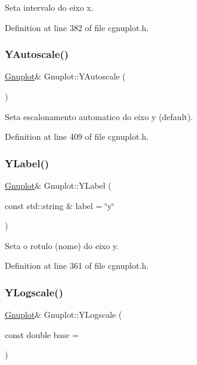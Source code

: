 Seta intervalo do eixo x. 



Definition at line 382 of file cgnuplot.\+h.

\mbox{\label{class_gnuplot_a288c0be86e20ff6986f5b43cb69b2bb0}} 
\subsubsection{\texorpdfstring{Y\+Autoscale()}{YAutoscale()}}
{\footnotesize\ttfamily \hyperlink{class_gnuplot}{Gnuplot}\& Gnuplot\+::\+Y\+Autoscale (\begin{DoxyParamCaption}{ }\end{DoxyParamCaption})\hspace{0.3cm}{\ttfamily [inline]}}



Seta escalonamento automatico do eixo y (default). 



Definition at line 409 of file cgnuplot.\+h.

\mbox{\label{class_gnuplot_ab4cdb8c1abd919b9851ca9a81667f2a4}} 
\subsubsection{\texorpdfstring{Y\+Label()}{YLabel()}}
{\footnotesize\ttfamily \hyperlink{class_gnuplot}{Gnuplot}\& Gnuplot\+::\+Y\+Label (\begin{DoxyParamCaption}\item[{const std\+::string \&}]{label = {\ttfamily \char`\"{}y\char`\"{}} }\end{DoxyParamCaption})\hspace{0.3cm}{\ttfamily [inline]}}



Seta o rotulo (nome) do eixo y. 



Definition at line 361 of file cgnuplot.\+h.

\mbox{\label{class_gnuplot_ab9b5e2985c658f7791d9a49dd7008bbf}} 
\subsubsection{\texorpdfstring{Y\+Logscale()}{YLogscale()}\hspace{0.1cm}{\footnotesize\ttfamily [1/2]}}
{\footnotesize\ttfamily \hyperlink{class_gnuplot}{Gnuplot}\& Gnuplot\+::\+Y\+Logscale (\begin{DoxyParamCaption}\item[{const double}]{base = {} }\end{DoxyParamCaption})\hspace{0.3cm}{\ttfamily [inline]}}



